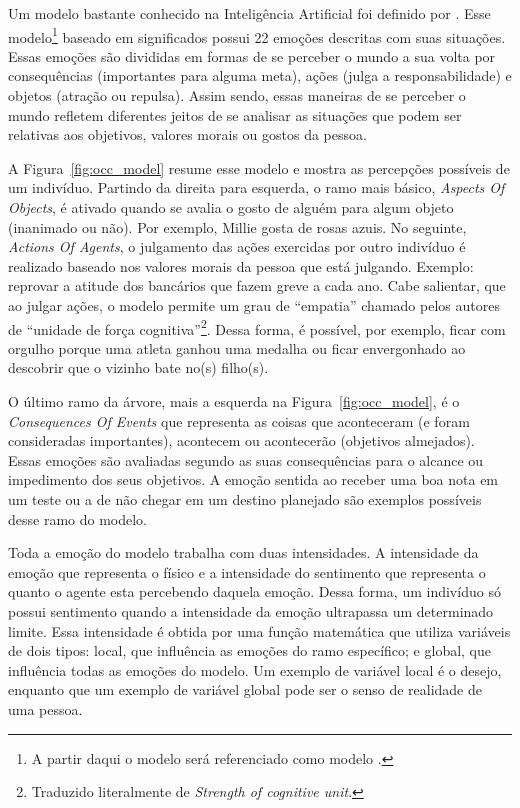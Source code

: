 Um modelo bastante conhecido na Inteligência Artificial foi definido por
\citet{ortony1988cse}. Esse modelo\footnote{A partir daqui o modelo será
referenciado como modelo \occ.} baseado em significados possui 22 emoções
descritas com suas situações. Essas emoções são divididas em
formas de se perceber o mundo a sua volta por consequências (importantes para
alguma meta), ações (julga a responsabilidade) e objetos (atração ou repulsa).
Assim sendo, essas maneiras de se perceber o mundo refletem diferentes jeitos
de se analisar as situações que podem ser relativas aos objetivos, valores
morais ou gostos da pessoa.

A Figura~\ref{fig:occ_model} resume esse modelo e mostra as
percepções possíveis de um indivíduo.  Partindo da direita para esquerda, o
ramo mais básico, \emph{Aspects Of Objects}, é ativado quando se avalia o
gosto de alguém para algum objeto (inanimado ou não). Por exemplo, Millie
gosta de rosas azuis. No seguinte, \emph{Actions Of Agents}, o julgamento das
ações exercidas por outro indivíduo é realizado baseado nos valores morais da
pessoa que está julgando. Exemplo: reprovar a atitude dos bancários que fazem
greve a cada ano. Cabe salientar, que ao julgar ações, o modelo permite um
grau de ``empatia'' chamado pelos autores de ``unidade de força
cognitiva''\footnote{Traduzido literalmente de \emph{Strength of cognitive
unit}.}. Dessa forma, é possível, por exemplo, ficar com orgulho porque uma
atleta ganhou uma medalha ou ficar envergonhado ao descobrir que o vizinho
bate no(s) filho(s).

O último ramo da árvore, mais a esquerda na Figura~\ref{fig:occ_model}, é o
\emph{Consequences Of Events} que representa as coisas que aconteceram (e
foram consideradas importantes), acontecem ou acontecerão (objetivos
almejados)\dev{}. Essas emoções são avaliadas segundo as suas consequências
para o alcance ou impedimento dos seus objetivos. A emoção sentida ao receber
uma boa nota em um teste ou a de não chegar em um destino planejado são
exemplos possíveis desse ramo do modelo.

Toda a emoção do modelo trabalha com duas intensidades. A intensidade da
emoção que representa o físico e a intensidade do sentimento que representa o
quanto o agente esta percebendo daquela emoção. Dessa forma, um indivíduo só
possui sentimento quando a intensidade da emoção ultrapassa um
determinado limite\dev{}.  Essa intensidade é obtida por uma função matemática
que utiliza variáveis de dois tipos: local, que influência as emoções do ramo
específico; e global, que influência todas as emoções do modelo.  Um exemplo
de variável local é o desejo, enquanto que um exemplo de variável global pode
ser o senso de realidade de uma pessoa.

